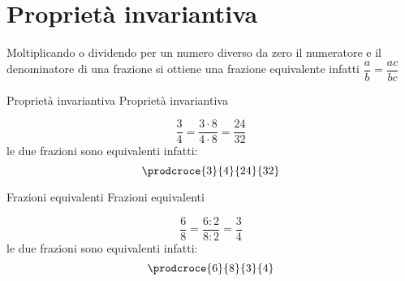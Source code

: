 \section{Proprietà  invariantiva}
\label{sec:propInvariantivaNumASS}
Moltiplicando o dividendo per un numero diverso da zero il numeratore e il denominatore di una frazione si ottiene una frazione equivalente 
infatti $\dfrac{a}{b}=\dfrac{ac}{bc}$
\begin{center}
\end{center}
\begin{esempiot}{Proprietà  invariantiva}{}
Proprietà  invariantiva
\end{esempiot}
\[\dfrac{3}{4}=\dfrac{3\cdot 8}{4\cdot 8}=\dfrac{24}{32}\]   le due frazioni sono equivalenti infatti: \[\prodcroce{3}{4}{24}{32}\]
\begin{esempiot}{Frazioni equivalenti}{}
Frazioni equivalenti
\end{esempiot}{}{}
\[\dfrac{6}{8}=\dfrac{6:2}{8:2}=\dfrac{3}{4}\]   le due frazioni sono equivalenti infatti: 
\[\prodcroce{6}{8}{3}{4}\]

